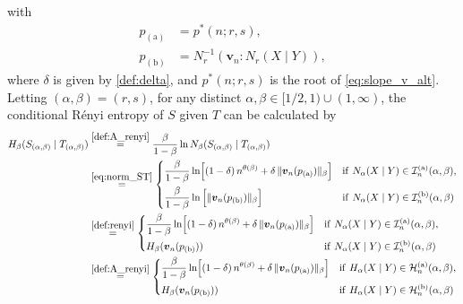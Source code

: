 \documentclass[conference, draftcls, onecolumn]{IEEEtran}
\theoremstyle{plain}
\newcommand{\bvec}[1]{\boldsymbol{#1}}
\begin{document}
with
\begin{align}
p_{(\mathrm{a})}
& =
p^{\ast}(n; r, s) ,
\\
p_{(\mathrm{b})}
& =
N_{r}^{-1}( \bvec{v}_{n} : N_{r}(X \mid Y) ) ,
\end{align}
where $\delta$ is given by \eqref{def:delta}, and $p^{\ast}(n; r, s)$ is the root of \eqref{eq:slope_v_alt}.
Letting $(\alpha, \beta) = (r, s)$, for any distinct $\alpha, \beta \in [1/2, 1) \cup (1, \infty)$, the conditional R\'{e}nyi entropy of $S$ given $T$ can be calculated by
\begin{align}
H_{\beta}(S_{(\alpha, \beta)} \mid T_{(\alpha, \beta)})
& \overset{\eqref{def:A_renyi}}{=}
\frac{ \beta }{ 1 - \beta } \ln N_{\beta}(S_{(\alpha, \beta)} \mid T_{(\alpha, \beta)})
\\
& \overset{\eqref{eq:norm_ST}}{=}
\begin{dcases}
\frac{ \beta }{ 1 - \beta } \ln \! \Big[ (1-\delta) \, n^{\theta( \beta )} + \delta \, \| \bvec{v}_{n}( p_{(\mathrm{a})} ) \|_{\beta} \Big]
& \mathrm{if} \ N_{\alpha}(X \mid Y) \in \mathcal{I}_{n}^{(\mathrm{a})}( \alpha, \beta ) ,
\\
\frac{ \beta }{ 1 - \beta } \ln \Big[ \| \bvec{v}_{n}( p_{(\mathrm{b})} ) \|_{\beta} \Big]
& \mathrm{if} \ N_{\alpha}(X \mid Y) \in \mathcal{I}_{n}^{(\mathrm{b})}( \alpha, \beta )
\end{dcases}
\\
& \overset{\eqref{def:renyi}}{=}
\begin{dcases}
\frac{ \beta }{ 1 - \beta } \ln \! \Big[ (1-\delta) \, n^{\theta( \beta )} + \delta \, \| \bvec{v}_{n}( p_{(\mathrm{a})} ) \|_{\beta} \Big]
& \mathrm{if} \ N_{\alpha}(X \mid Y) \in \mathcal{I}_{n}^{(\mathrm{a})}( \alpha, \beta ) ,
\\
H_{\beta}( \bvec{v}_{n}( p_{(\mathrm{b})} ) )
& \mathrm{if} \ N_{\alpha}(X \mid Y) \in \mathcal{I}_{n}^{(\mathrm{b})}( \alpha, \beta )
\end{dcases}
\\
& \overset{\eqref{def:A_renyi}}{=}
\begin{dcases}
\frac{ \beta }{ 1 - \beta } \ln \! \Big[ (1-\delta) \, n^{\theta( \beta )} + \delta \, \| \bvec{v}_{n}( p_{(\mathrm{a})} ) \|_{\beta} \Big]
& \mathrm{if} \ H_{\alpha}(X \mid Y) \in \mathcal{H}_{n}^{(\mathrm{a})}( \alpha, \beta ) ,
\\
H_{\beta}( \bvec{v}_{n}( p_{(\mathrm{b})} ) )
& \mathrm{if} \ H_{\alpha}(X \mid Y) \in \mathcal{H}_{n}^{(\mathrm{b})}( \alpha, \beta )
\end{dcases}
\label{eq:renyi_ST}
\end{align}
\end{document}
